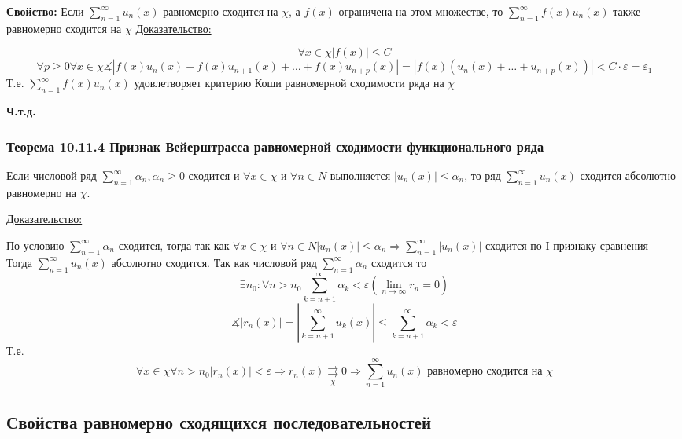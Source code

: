 \documentclass[12pt]{article}
\let\oldsum\sum
\let\oldlim\lim
\renewcommand{\sum}{\oldsum\limits}
\renewcommand{\lim}{\oldlim\limits}
\begin{document}
  \textbf{Свойство: } Если $\sum_{n=1}^{\infty} u_n(x)$ равномерно сходится на $\chi$, а $f(x)$
    ограничена на этом множестве, то $\sum_{n=1}^{\infty} f(x)u_n(x)$ также равномерно сходится на $\chi$
  \underline{Доказательство:}
  \begin{adjustwidth}{1.5em}{1.5em}
    \[\forall x \in \chi |f(x)|\leq C\]
    \[\forall p \geq 0 \forall x \in \chi \measuredangle |f(x)u_n(x)+f(x)u_{n+1}(x)+\dots+f(x)u_{n+p}(x)|
    =|f(x)(u_n(x)+\dots+u_{n+p}(x))| < C \cdot \varepsilon = \varepsilon_1\]
    Т.е. $\sum_{n=1}^{\infty} f(x)u_n(x)$ удовлетворяет критерию Коши равномерной сходимости ряда на $\chi$
  \end{adjustwidth}
  \begin{center}
    \textbf{Ч.т.д.}
  \end{center}

  \subsubsection*{Теорема 10.11.4 Признак Вейерштрасса равномерной сходимости функционального ряда}\label{th:}
  \par\noindent
  Если числовой ряд $\sum_{n=1}^{\infty} \alpha_n, \alpha_n \geq 0$ сходится и $\forall x \in \chi$ и 
  $\forall n \in N$ выполняется $|u_n(x)|\leq \alpha_n$, то ряд $\sum_{n=1}^{\infty} u_n(x)$ сходится 
  абсолютно равномерно на $\chi$.

  \underline{Доказательство:}
  \begin{adjustwidth}{1.5em}{1.5em}
    По условию $\sum_{n=1}^{\infty} \alpha_n$ сходится, тогда так как 
    $\forall x \in \chi$ и $\forall n \in N |u_n(x)|\leq \alpha_n \Rightarrow \sum_{n=1}^{\infty} |u_n(x)|$
    сходится по I признаку сравнения\\
    Тогда $\sum_{n=1}^{\infty} u_n(x)$ абсолютно сходится. Так как числовой ряд $\sum_{n=1}^{\infty} \alpha_n$
    сходится то \[\exists n_0:\forall n>n_0 \sum_{k=n+1}^{\infty}\alpha_k < \varepsilon (\lim_{n \to \infty} r_n =0)\]
    \[\measuredangle |r_n(x)|=|\sum_{k=n+1}^{\infty} u_k(x)| \leq \sum_{k=n+1}^{\infty} \alpha_k<\varepsilon\]
    Т.е.
    \[\forall x \in \chi \forall n >n_0 |r_n(x)| < \varepsilon \Rightarrow r_n(x) \underset{\chi}{\rightrightarrows}
    0 \Rightarrow \sum_{n=1}^{\infty} u_n(x) \text{ равномерно сходится на } \chi\]
  \end{adjustwidth}
  \subsection{Свойства равномерно сходящихся последовательностей}
\end{document}
